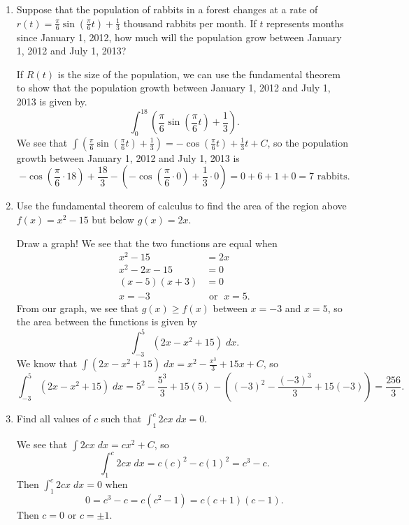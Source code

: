 \documentclass[11pt]{article}
\begin{document}
\begin{enumerate}
{  }
  \vfill

\item Suppose that the population of rabbits in a forest changes at a
  rate of $r(t) = \frac{\pi}{6}\sin\left(\frac{\pi}{6}t\right) +
  \frac{1}{3}$ thousand rabbits per month.  If $t$ represents months
  since January 1, 2012, how much will the population grow between
  January 1, 2012 and July 1, 2013?

  \vfill
  {\color{blue}

    If $R(t)$ is the size of the population, we can use the
    fundamental theorem to show that the population growth between
    January 1, 2012 and July 1, 2013 is given by.
    \[
    \int_0^{18} \left(\frac{\pi}{6}\sin\left(\frac{\pi}{6}t\right) +
      \frac{1}{3}\right).
    \]
    We see that $\int
    \left(\frac{\pi}{6}\sin\left(\frac{\pi}{6}t\right) +
      \frac{1}{3}\right) = -\cos\left(\frac{\pi}{6}t\right) +
    \frac{1}{3}t + C$, so the population growth between January 1, 2012
    and July 1, 2013 is
    \[
    -\cos\left(\frac{\pi}{6}\cdot 18\right) +
    \frac{18}{3} - \left(-\cos\left(\frac{\pi}{6}\cdot 0\right) +
    \frac{1}{3}\cdot 0\right) = 0 + 6 + 1 + 0= 7\text{ rabbits}.
    \]

  }
  \vfill

  \newpage
  
\item Use the fundamental theorem of calculus to find the area of the
  region above $f(x) = x^2 - 15$ but below $g(x) = 2x$.
  
  \vfill
  {\color{blue}

    Draw a graph! We see that the two functions are equal when
    \begin{align*}
      x^2 - 15 &= 2x\\
      x^2 - 2x - 15 &= 0\\
      (x-5)(x+3) &= 0\\
      x = -3\; &\text{ or }\; x = 5.
    \end{align*}
    From our graph, we see that $g(x) \geq f(x)$ between $x=-3$ and
    $x=5$, so the area between the functions is given by
    \[
    \int_{-3}^5 (2x - x^2 + 15)\; dx.
    \]
    We know that $\int (2x - x^2 + 15)\; dx = x^2 - \frac{x^3}{3} +
    15x + C$, so
    \[
    \int_{-3}^5 (2x - x^2 + 15)\; dx = 5^2 - \frac{5^3}{3} + 15(5) -
    \left((-3)^2 - \frac{(-3)^3}{3} + 15(-3)\right) = \frac{256}{3}.
    \]

  }
  \vfill

\item Find all values of $c$ such that $\displaystyle\int_{1}^c 2cx\; dx = 0$.

  \vfill
  {\color{blue}

    We see that $\int 2cx\; dx = cx^2 + C$, so
    \[
    \int_{1}^c 2cx\; dx = c(c)^2 - c(1)^2 = c^3 - c.
    \]
    Then $\int_{1}^c 2cx\; dx = 0$ when
    \[
    0 = c^3 - c = c(c^2 - 1) = c(c+1)(c-1).
    \]
    Then $c = 0$ or $c= \pm 1$.

  }
  \vfill

\end{enumerate}
\end{document}
